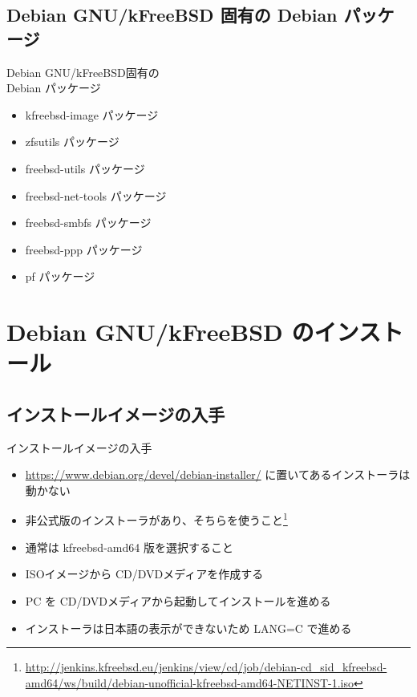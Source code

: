 \subsection{Debian GNU/kFreeBSD 固有の Debian パッケージ}
\begin{frame}{Debian GNU/kFreeBSD固有の\\Debian パッケージ}
  \begin{itemize}
  \item kfreebsd-image パッケージ
  \item zfsutils パッケージ    
  \item freebsd-utils パッケージ
  \item freebsd-net-tools パッケージ
  \item freebsd-smbfs パッケージ
  \item freebsd-ppp パッケージ
  \item pf パッケージ
  \end{itemize}
\end{frame}


\section{Debian GNU/kFreeBSD のインストール}

\subsection{インストールイメージの入手}
\begin{frame}{インストールイメージの入手}
  \begin{itemize}
  \item \url{https://www.debian.org/devel/debian-installer/} に置いてあるインストーラは動かない
  \item 非公式版のインストーラがあり、そちらを使うこと\footnote{\url{http://jenkins.kfreebsd.eu/jenkins/view/cd/job/debian-cd_sid_kfreebsd-amd64/ws/build/debian-unofficial-kfreebsd-amd64-NETINST-1.iso}}
  \item 通常は kfreebsd-amd64 版を選択すること
  \item ISOイメージから CD/DVDメディアを作成する
  \item PC を CD/DVDメディアから起動してインストールを進める
  \item インストーラは日本語の表示ができないため LANG=C で進める
  \end{itemize}
\end{frame}

